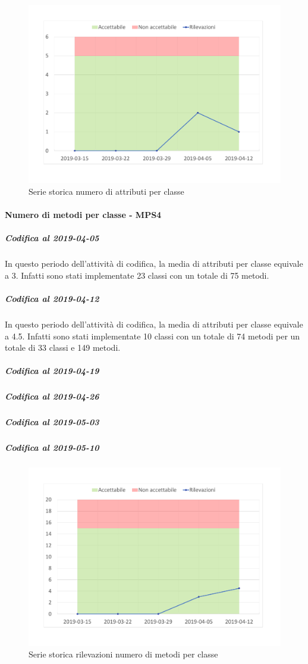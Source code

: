 \begin{figure}[H]
	\centering
	\includegraphics[scale=0.6]{images/resoconto/MPS3Chart.pdf}
	\caption{Serie storica numero di attributi per classe}	
\end{figure}

\paragraph{Numero di metodi per classe - MPS4}
\subparagraph{Codifica al 2019-04-05}
In questo periodo dell'attività di codifica, la media di attributi per classe equivale a 3. Infatti sono stati implementate 23 classi con un totale di 75 metodi.

\subparagraph{Codifica al 2019-04-12}
In questo periodo dell'attività di codifica, la media di attributi per classe equivale a 4.5. Infatti sono stati implementate 10 classi con un totale di 74 metodi per un totale di 33 classi e 149 metodi.

\subparagraph{Codifica al 2019-04-19}


\subparagraph{Codifica al 2019-04-26}

\subparagraph{Codifica al 2019-05-03}

\subparagraph{Codifica al 2019-05-10}

\begin{figure}[H]
	\centering
	\includegraphics[scale=0.6]{images/resoconto/MPS4Chart.pdf}
	\caption{Serie storica rilevazioni numero di metodi per classe}	
\end{figure}

